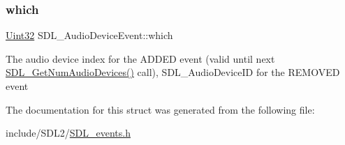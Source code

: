 \subsubsection{\texorpdfstring{which}{which}}
{\footnotesize\ttfamily \hyperlink{_s_d_l__stdinc_8h_add440eff171ea5f55cb00c4a9ab8672d}{Uint32} S\+D\+L\+\_\+\+Audio\+Device\+Event\+::which}

The audio device index for the A\+D\+D\+ED event (valid until next \hyperlink{_s_d_l__audio_8h_ae165f64b3f0fecfebe1c97731600ca59}{S\+D\+L\+\_\+\+Get\+Num\+Audio\+Devices()} call), S\+D\+L\+\_\+\+Audio\+Device\+ID for the R\+E\+M\+O\+V\+ED event 

The documentation for this struct was generated from the following file\+:\begin{DoxyCompactItemize}
\item 
include/\+S\+D\+L2/\hyperlink{_s_d_l__events_8h}{S\+D\+L\+\_\+events.\+h}\end{DoxyCompactItemize}
